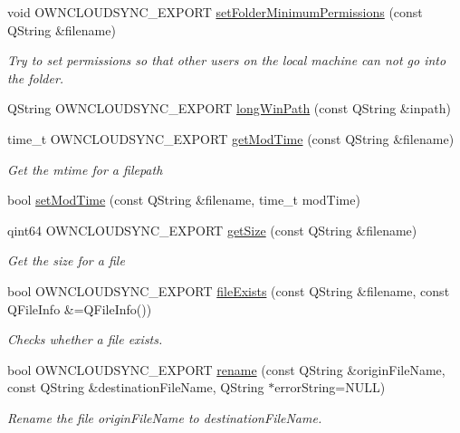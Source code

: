 \begin{DoxyCompactItemize}
void O\+W\+N\+C\+L\+O\+U\+D\+S\+Y\+N\+C\+\_\+\+E\+X\+P\+O\+RT \hyperlink{namespace_o_c_c_1_1_file_system_a5e58f0f7b6dab23f3dc1778b86bc2c6b}{set\+Folder\+Minimum\+Permissions} (const Q\+String \&filename)
\begin{DoxyCompactList}\small\item\em Try to set permissions so that other users on the local machine can not go into the folder. \end{DoxyCompactList}\item 
Q\+String O\+W\+N\+C\+L\+O\+U\+D\+S\+Y\+N\+C\+\_\+\+E\+X\+P\+O\+RT \hyperlink{namespace_o_c_c_1_1_file_system_a71e7eb587b2d6502e9d4b46746afb4b1}{long\+Win\+Path} (const Q\+String \&inpath)
\item 
time\+\_\+t O\+W\+N\+C\+L\+O\+U\+D\+S\+Y\+N\+C\+\_\+\+E\+X\+P\+O\+RT \hyperlink{namespace_o_c_c_1_1_file_system_a9610837b3c96d1a689cd016b2ccb8fc4}{get\+Mod\+Time} (const Q\+String \&filename)
\begin{DoxyCompactList}\small\item\em Get the mtime for a filepath \end{DoxyCompactList}\item 
bool \hyperlink{namespace_o_c_c_1_1_file_system_a1f35d1664358d204ec7357adfa91f7da}{set\+Mod\+Time} (const Q\+String \&filename, time\+\_\+t mod\+Time)
\item 
qint64 O\+W\+N\+C\+L\+O\+U\+D\+S\+Y\+N\+C\+\_\+\+E\+X\+P\+O\+RT \hyperlink{namespace_o_c_c_1_1_file_system_a9da1655cd64b4fdd14eb745c05162fb8}{get\+Size} (const Q\+String \&filename)
\begin{DoxyCompactList}\small\item\em Get the size for a file \end{DoxyCompactList}\item 
bool O\+W\+N\+C\+L\+O\+U\+D\+S\+Y\+N\+C\+\_\+\+E\+X\+P\+O\+RT \hyperlink{namespace_o_c_c_1_1_file_system_a667715e37de108acf2f298f3da489456}{file\+Exists} (const Q\+String \&filename, const Q\+File\+Info \&=Q\+File\+Info())
\begin{DoxyCompactList}\small\item\em Checks whether a file exists. \end{DoxyCompactList}\item 
bool O\+W\+N\+C\+L\+O\+U\+D\+S\+Y\+N\+C\+\_\+\+E\+X\+P\+O\+RT \hyperlink{namespace_o_c_c_1_1_file_system_a8aecdf1d35430c2d0e9b8c6d274c71dc}{rename} (const Q\+String \&origin\+File\+Name, const Q\+String \&destination\+File\+Name, Q\+String $\ast$error\+String=N\+U\+LL)
\begin{DoxyCompactList}\small\item\em Rename the file {\itshape origin\+File\+Name} to {\itshape destination\+File\+Name}. \end{DoxyCompactList}\item 

\end{DoxyCompactItemize}
